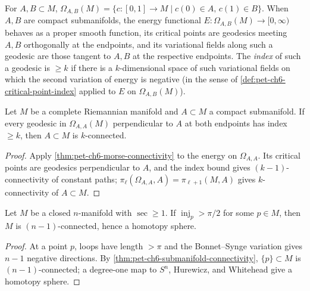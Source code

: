 \begin{definition}
  \label{def:pet-ch6-path-space-AB}
  \leanok
  For $A,B\subset M$, $\Omega_{A,B}(M)=\{c:[0,1]\to M\mid c(0)\in A,\,c(1)\in
  B\}$. When $A,B$ are compact submanifolds, the energy functional
  $E:\Omega_{A,B}(M)\to[0,\infty)$ behaves as a proper smooth function, its
  critical points are geodesics meeting $A,B$ orthogonally at the endpoints,
  and its variational fields along such a geodesic are those tangent to $A,B$
  at the respective endpoints. The \emph{index} of such a geodesic is $\ge k$
  if there is a $k$-dimensional space of such variational fields on which the
  second variation of energy is negative (in the sense of
  \cref{def:pet-ch6-critical-point-index} applied to $E$ on
  $\Omega_{A,B}(M)$).
\end{definition}

\begin{theorem}
  \label{thm:pet-ch6-submanifold-connectivity}
  Let $M$ be a complete Riemannian manifold and $A\subset M$ a compact
  submanifold. If every geodesic in $\Omega_{A,A}(M)$ perpendicular to $A$ at
  both endpoints has index $\ge k$, then $A\subset M$ is $k$-connected.
\end{theorem}
\begin{proof}
  \sketch
  Apply \cref{thm:pet-ch6-morse-connectivity} to the energy on \(\Omega_{A,A}\). Its critical points are geodesics perpendicular to \(A\), and the index bound gives \((k-1)\)-connectivity of constant paths; \(\pi_\ell(\Omega_{A,A},A)=\pi_{\ell+1}(M,A)\) gives \(k\)-connectivity of \(A\subset M\).
\end{proof}

\begin{theorem}
  \label{thm:pet-ch6-berger-sphere-theorem}
  Let $M$ be a closed $n$-manifold with $\sec\ge1$. If $\operatorname{inj}_p>\pi/2$ for
  some $p\in M$, then $M$ is $(n-1)$-connected, hence a homotopy sphere.
\end{theorem}
\begin{proof}
  \sketch
  At a point \(p\), loops have length \(>\pi\) and the Bonnet--Synge variation gives \(n-1\) negative directions. By \cref{thm:pet-ch6-submanifold-connectivity}, \(\{p\}\subset M\) is \((n-1)\)-connected; a degree-one map to \(S^n\), Hurewicz, and Whitehead give a homotopy sphere.
\end{proof}

